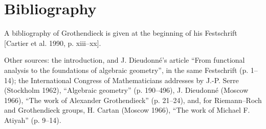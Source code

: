 \documentclass[11pt]{article}
\begin{document}
\section*{Bibliography}

A bibliography of Grothendieck is given at the beginning of his Festschrift [Cartier et al. 1990, p. xiii--xx].

Other sources: the introduction, and J. Dieudonné's article ``From functional analysis to the foundations of algebraic geometry'', in the same Festschrift (p. 1--14); the International Congress of Mathematicians addresses by J.-P. Serre (Stockholm 1962), ``Algebraic geometry'' (p. 190--496), J. Dieudonné (Moscow 1966), ``The work of Alexander Grothendieck'' (p. 21--24), and, for Riemann--Roch and Grothendieck groups, H. Cartan (Moscow 1966), ``The work of Michael F. Atiyah'' (p. 9--14).
\end{document}
